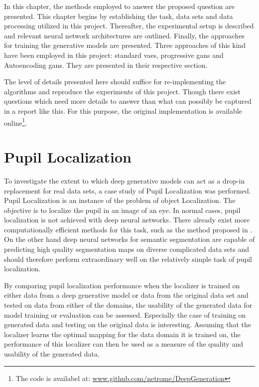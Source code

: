 In this chapter, the methods employed to answer the proposed question are presented. This chapter begins by establishing the task, data sets and data processing utilized in this project. Thereafter, the experimental setup is described and relevant neural network architectures are outlined. Finally, the approaches for training the generative models are presented. Three approaches of this kind have been employed in this project: standard \acrshort{vaes}, progressive \acrshort{gans} and Autoencoding \acrshort{gans}. They are presented in their respective section. 

The level of details presented here should suffice for re-implementing the algorithms and reproduce the experiments of this project. Though there exist questions which need more details to answer than what can possibly be captured in a report like this. For this purpose, the original implementation is available online\footnote{The code is availabel at: \url{www.github.com/netrome/DeepGeneration}}.

\section{Pupil Localization}
To investigate the extent to which deep generative models can act as a drop-in replacement for real data sets, a case study of Pupil Localization was performed. Pupil Localization is an instance of the problem of object Localization. The objective is to localize the pupil in an image of an eye. In normal cases, pupil localization is not achieved with deep neural networks. There already exist more computationally efficient methods for this task, such as the method proposed in \parencite{markuvs2014eye}. On the other hand deep neural networks for semantic segmentation are capable of predicting high quality segmentation maps on diverse complicated data sets \parencite{ChenPK0Y16semantic} and should therefore perform extraordinary well on the relatively simple task of pupil localization.

By comparing pupil localization performance when the localizer is trained on either data from a deep generative model or data from the original data set and tested on data from either of the domains, the usability of the generated data for model training or evaluation can be assessed. Especially the case of training on generated data and testing on the original data is interesting. Assuming that the localizer learns the optimal mapping for the data domain it is trained on, the performance of this localizer can then be used as a measure of the quality and usability of the generated data. 

